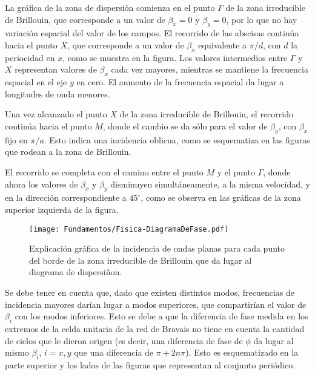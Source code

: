 La gráfica de la zona de dispersión comienza en el punto $\Gamma$ de la zona irreducible de Brillouin, que corresponde a un valor de $\beta_x = 0$ y $\beta_y = 0$, por lo que no hay variación espacial del valor de los campos. El recorrido de las abscisas continúa hacia el punto $X$, que corresponde a un valor de $\beta_x$ equivalente a $\pi / d$, con $d$ la periocidad en $x$, como se muestra en la figura. Los valores intermedios entre $\Gamma$ y $X$ representan valores de $\beta_x$ cada vez mayores, mientras se mantiene la frecuencia espacial en el eje $y$ en cero. El aumento de la frecuencia espacial da lugar a longitudes de onda menores.

Una vez alcanzado el punto $X$ de la zona irreducible de Brillouin, el recorrido continúa hacia el punto $M$, donde el cambio se da sólo para el valor de $\beta_y$, con $\beta_x$ fijo en $\pi / a$. Esto indica una incidencia oblicua, como se esquematiza en las figuras que rodean a la zona de Brillouin.

El recorrido se completa con el camino entre el punto $M$ y el punto $\Gamma$, donde ahora los valores de $\beta_x$ y $\beta_y$ disminuyen simultáneamente, a la misma velocidad, y en la dirección correspondiente a $45^\circ$, como se observa en las gráficas de la zona superior izquierda de la figura.

\begin{figure}[h]
	\centering
	\texttt{[image: Fundamentos/Fisica-DiagramaDeFase.pdf]}
	\caption{Explicación gráfica de la incidencia de ondas planas para cada punto del borde de la zona irreducible de Brillouin que da lugar al diagrama de dispersiñon.}
	\label{fig:explicacion-zona-brillouin}
\end{figure}

Se debe tener en cuenta que, dado que existen distintos modos, frecuencias de incidencia mayores darían lugar a modos superiores, que compartirían el valor de $\beta_i$ con los modos inferiores. Esto se debe a que la diferencia de fase medida en los extremos de la celda unitaria de la red de Bravais no tiene en cuenta la cantidad de ciclos que le dieron origen (es decir, una diferencia de fase de $\phi$ da lugar al mismo $\beta_i$, $i=x,y$ que una diferencia de $\pi+2 n \pi$). Esto es esquematizado en la parte superior y los lados de las figuras que representan al conjunto periódico.

